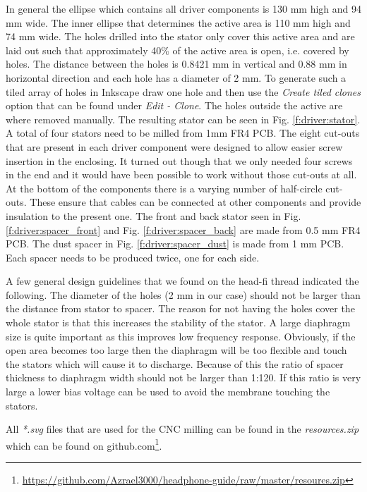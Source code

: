 \documentclass{article}
\begin{document}
In general the ellipse which contains all driver components is 130 mm high and 94 mm wide. The inner ellipse that determines the active area is 110 mm high and 74 mm wide. The holes drilled into the stator only cover this active area and are laid out such that approximately 40\% of the active area is open, i.e. covered by holes. The distance between the holes is 0.8421 mm in vertical and 0.88 mm in horizontal direction and each hole has a diameter of 2 mm. To generate such a tiled array of holes in Inkscape draw one hole and then use the \textit{Create tiled clones} option that can be found under \textit{Edit - Clone}. The holes outside the active are where removed manually. The resulting stator can be seen in Fig. \ref{f:driver:stator}. A total of four stators need to be milled from 1mm FR4 PCB. The eight cut-outs that are present in each driver component were designed to allow easier screw insertion in the enclosing. It turned out though that we only needed four screws in the end and it would have been possible to work without those cut-outs at all. At the bottom of the components there is a varying number of half-circle cut-outs. These ensure that cables can be connected at other components and provide insulation to the present one. The front and back stator seen in Fig. \ref{f:driver:spacer_front} and Fig. \ref{f:driver:spacer_back} are made from 0.5 mm FR4 PCB. The dust spacer in Fig. \ref{f:driver:spacer_dust} is made from 1 mm PCB. Each spacer needs to be produced twice, one for each side.

A few general design guidelines that we found on the head-fi thread indicated the following. The diameter of the holes (2 mm in our case) should not be larger than the distance from stator to spacer. The reason for not having the holes cover the whole stator is that this increases the stability of the stator. A large diaphragm size is quite important as this improves low frequency response. Obviously, if the open area becomes too large then the diaphragm will be too flexible and touch the stators which will cause it to discharge. Because of this the ratio of spacer thickness to diaphragm width should not be larger than 1:120. If this ratio is very large a lower bias voltage can be used to avoid the membrane touching the stators.

All \textit{*.svg} files that are used for the CNC milling can be found in the \textit{resources.zip} which can be found on github.com\footnote{\url{https://github.com/Azrael3000/headphone-guide/raw/master/resoures.zip}}.
\end{document}
